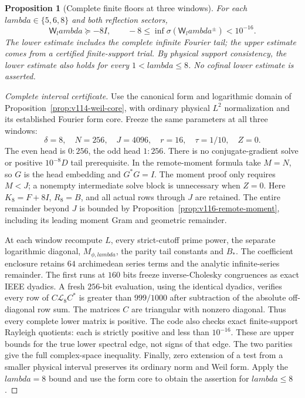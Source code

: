\documentclass[11pt]{article}
\def\lambda{lambda}%
\newtheorem{proposition}[theorem]{Proposition}
\theoremstyle{remark}
\begin{document}
\begin{proposition}[Complete finite floors at three windows]
\label{prop:v138-three-floors}
For each $\lambda\in\{5,6,8\}$ and both reflection sectors,
\begin{equation}\label{eq:v138-three-floors}
 \mathsf W_\lambda\succeq-8I,\qquad
 -8\le\inf\sigma(\mathsf W_\lambda^{\pm})<10^{-16}.
\end{equation}
The lower estimate includes the complete infinite Fourier tail;
the upper estimate comes from a certified finite-support trial.
By physical support consistency, the lower estimate also holds for
every $1<\lambda\le8$. No cofinal lower estimate is asserted.
\end{proposition}
\begin{proof}[Complete interval certificate]
Use the canonical form and logarithmic domain of
Proposition~\ref{prop:v114-weil-core}, with ordinary physical
$L^2$ normalization and its established Fourier form core. Freeze
the same parameters at all three windows:
\[
 \delta=8,\quad N=256,\quad J=4096,\quad r=16,
 \quad\tau=1/10,\quad Z=0.
\]
The even head is $0{:}256$, the odd head $1{:}256$. There is no
conjugate-gradient solve or positive $10^{-8}D$ tail prerequisite.
In the remote-moment formula take $M=N$, so $G$ is the head embedding
and $G^*G=I$. The moment proof only requires $M<J$; a nonempty
intermediate solve block is unnecessary when $Z=0$.
Here $K_8=F+8I$, $R_8=B$, and all actual rows through $J$ are retained.
The entire remainder beyond $J$ is bounded by
Proposition~\ref{prop:v116-remote-moment}, including its leading
moment Gram and geometric remainder.

At each window recompute $L$, every strict-cutoff prime power,
the separate logarithmic diagonal, $M_{\phi,\lambda}$, the parity
tail constants and $B_*$. The coefficient enclosure retains $64$
archimedean series terms and the analytic infinite-series remainder.
The first runs at $160$ bits freeze inverse-Cholesky congruences as
exact IEEE dyadics. A fresh $256$-bit evaluation, using the identical
dyadics, verifies every row of
$C\mathcal L_8C^*$ is greater than $999/1000$ after subtraction
of the absolute off-diagonal row sum. The matrices $C$ are triangular
with nonzero diagonal. Thus every complete lower matrix is positive.
The code also checks exact finite-support Rayleigh quotients: each
is strictly positive and less than $10^{-16}$. These are upper
bounds for the true lower spectral edge, not signs of that edge.
The two parities give the full complex-space inequality.
Finally, zero extension of a test from a smaller physical interval
preserves its ordinary norm and Weil form. Apply the $\lambda=8$
bound and use the form core to obtain the assertion for $\lambda\le8$.
\end{proof}
\end{document}
